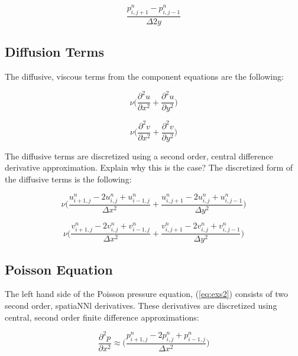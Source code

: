 \begin{equation*}
\frac{p^n_{i,j+1} - p^n_{i,j-1}}{\Delta{2y}}
\end{equation*}

\subsection{Diffusion Terms}

The diffusive, viscous terms from the component equations are the following:

\begin{equation}
\nu \bigg( \frac{\partial^2u}{\partial{x}^2} + \frac{\partial^2u}{\partial{y}^2} \bigg)
\end{equation}

\begin{equation*}
\nu \bigg( \frac{\partial^2v}{\partial{x}^2} + \frac{\partial^2v}{\partial{y}^2} \bigg)
\end{equation*}

The diffusive terms are discretized using a second order, central difference derivative approximation.
Explain why this is the case?
The discretized form of the diffusive terms is the following:

\begin{equation}
\nu \Bigg( \frac{u^n_{i+1,j} -2u^n_{i,j} +  u^n_{i-1,j}}{\Delta{x^2}} + \frac{u^n_{i,j+1} -2u^n_{i,j} + u^n_{i,j-1}}{\Delta{y^2}} \Bigg)
\end{equation}

\begin{equation*}
\nu \Bigg( \frac{v^n_{i+1,j} -2v^n_{i,j} + v^n_{i-1,j}}{\Delta{x^2}} + \frac{v^n_{i,j+1} -2v^n_{i,j} + v^n_{i,j-1}}{\Delta{y^2}} \Bigg)
\end{equation*}

\subsection{Poisson Equation}

The left hand side of the Poisson pressure equation, (\ref{eq:exs2}) consists of two second order, spatiaNNl derivatives.
These derivatives are discretized using central, second order finite difference approximations:

\begin{equation}
\frac{\partial^2p}{\partial{x}^2} \approx \Bigg( \frac{p^n_{i+1,j} -2p^n_{i,j} + p^n_{i-1,j}}{\Delta{x^2}} \Bigg)
\end{equation}

